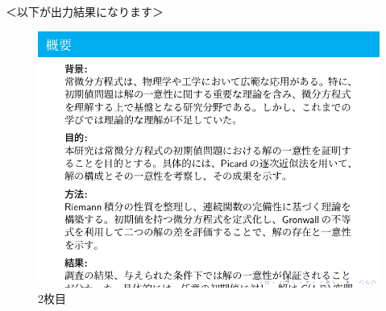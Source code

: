 \documentclass[a4paper]{article}
\begin{document}
\begin{enumerate}
            \newpage
            
            ＜以下が出力結果になります＞\\
            \begin{figure}[h]
                \centering
                \includegraphics[scale=0.7]{sijibun2.pdf}
                \caption{2枚目}
            \end{figure}

        \end{enumerate}
\end{document}
